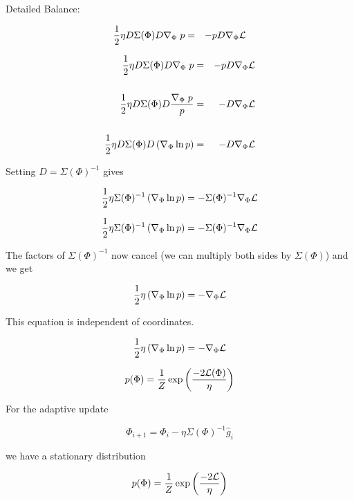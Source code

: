 {\vfill
Detailed Balance:

\vfill
\vspace{-2ex}
\begin{eqnarray*}
\frac{1}{2} \eta D\Sigma(\Phi) D \nabla_\Phi\; {p} & = & - p D \nabla_\Phi {\cal L}
\end{eqnarray*}


\vspace{-2ex}
\begin{eqnarray*}
\frac{1}{2} \eta D\Sigma(\Phi) D \nabla_\Phi\; {p} & = & - p D \nabla_\Phi {\cal L} \\
\\
\frac{1}{2} \eta D \Sigma(\Phi)  D \frac{\nabla_\Phi\;p}{p} & = & - D \nabla_\Phi {\cal L} \\
\\
\frac{1}{2} \eta D \Sigma(\Phi) D \left(\nabla_\Phi \ln p\right) & = &  - D \nabla_\Phi {\cal L}
\end{eqnarray*}

\vfill
Setting {\color{red} $D = \Sigma(\Phi)^{-1}$} gives

\vfill
$$\frac{1}{2} \eta \Sigma(\Phi)^{-1} \left(\nabla_\Phi \ln p\right) = - \Sigma(\Phi)^{-1} \nabla_\Phi {\cal L}$$


$$\frac{1}{2} \eta \Sigma(\Phi)^{-1} \left(\nabla_\Phi \ln p\right) = - \Sigma(\Phi)^{-1} \nabla_\Phi {\cal L}$$

\vfill
The factors of $\Sigma(\Phi)^{-1}$ now cancel (we can multiply both sides by $\Sigma(\Phi)$) and we get

\vfill
$$\frac{1}{2} \eta \left(\nabla_\Phi \ln p\right)  =  - \nabla_\Phi {\cal L}$$

\vfill
This equation is independent of coordinates.


$$\frac{1}{2} \eta \left(\nabla_\Phi \ln p\right)  =  - \nabla_\Phi {\cal L}$$

\vfill
$$p(\Phi) = \frac{1}{Z} \exp\left(\frac{-2{\cal L}(\Phi)}{\eta}\right)$$


For the adaptive update

\vfill
$$\Phi_{i+1} = \Phi_{i} - \eta \Sigma(\Phi)^{-1} \hat{g}_i$$

\vfill
we have a stationary distribution

\vfill
$$p(\Phi) = \frac{1}{Z} \exp\left(\frac{-2{\cal L}}{\eta}\right)$$

}
